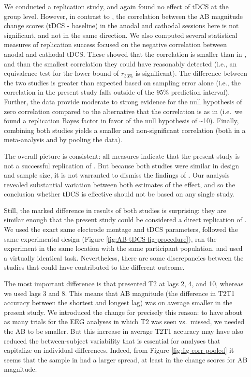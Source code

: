 \documentclass[11pt,]{memoir}
\begin{document}
We conducted a replication study, and again found no effect of tDCS at the group level. However, in contrast to \textcite{London2015}, the correlation between the AB magnitude change scores (tDCS - baseline) in the anodal and cathodal sessions here is not significant, and not in the same direction. We also computed several statistical measures of replication success focused on the negative correlation between anodal and cathodal tDCS. These showed that the correlation is smaller than in \textcite{London2015}, and than the smallest correlation they could have reasonably detected (i.e., an equivalence test for the lower bound of \(r_{33\%}\) \autocite{Simonsohn2015} is significant). The difference between the two studies is greater than expected based on sampling error alone (i.e., the correlation in the present study falls outside of the 95\% prediction interval). Further, the data provide moderate to strong evidence for the null hypothesis of zero correlation compared to the alternative that the correlation is as in \textcite{London2015} (i.e.~we found a replication Bayes factor in favor of the null hypothesis of \textasciitilde{}10). Finally, combining both studies yields a smaller and non-significant correlation (both in a meta-analysis and by pooling the data).

The overall picture is consistent: all measures indicate that the present study is not a successful replication of \textcite{London2015}. But because both studies were similar in design and sample size, it is not warranted to dismiss the findings of \textcite{London2015}. Our analysis revealed substantial variation between both estimates of the effect, and so the conclusion whether tDCS is effective should not be based on any single study.

Still, the marked difference in results of both studies is surprising: they are similar enough that the present study could be considered a direct replication of \textcites{London2015}{Zwaan2018}. We used the exact same electrode montage and tDCS parameters, followed the same experimental design (Figure \ref{fig:AB-tDCS-fig-procedure}), ran the experiment in the same location with the same participant population, and used a virtually identical task. Nevertheless, there are some discrepancies between the studies that could have contributed to the different outcome.

The most important difference is that \textcite{London2015} presented T2 at lags 2, 4, and 10, whereas we used lags 3 and 8. This means that AB magnitude (the difference in T2\textbar{}T1 accuracy between the shortest and longest lag) was on average smaller in the present study. We introduced the change for precisely this reason: to have about as many trials for the EEG analyses in which T2 was seen vs.~missed, we needed the AB to be smaller. But this increase in average T2\textbar{}T1 accuracy may have also reduced the between-subject variability that is essential for analyses that capitalize on individual differences. Indeed, from Figure \ref{fig:fig-corr-pooled} it seems that the sample in \textcite{London2015} had a larger spread, at least in the change scores for AB magnitude.
\end{document}
